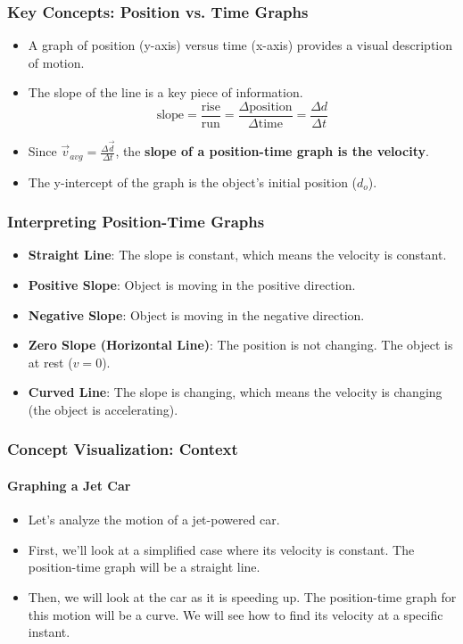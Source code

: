 \documentclass{beamer}
\begin{document}
\begin{frame}
\frametitle{Key Concepts: Position vs. Time Graphs}
\begin{itemize}
    \item A graph of position (y-axis) versus time (x-axis) provides a visual description of motion.
    \pause
    \item The \alert{slope} of the line is a key piece of information.
    \[ \text{slope} = \frac{\text{rise}}{\text{run}} = \frac{\Delta \text{position}}{\Delta \text{time}} = \frac{\Delta d}{\Delta t} \]
    \pause
    \item Since $\vec{v}_{avg} = \frac{\Delta \vec{d}}{\Delta t}$, the \textbf{slope of a position-time graph is the velocity}.
    \pause
    \item The \alert{y-intercept} of the graph is the object's initial position ($d_o$).
\end{itemize}
\end{frame}

\begin{frame}
\frametitle{Interpreting Position-Time Graphs}
\begin{itemize}
    \item \textbf{Straight Line}: The slope is constant, which means the \alert{velocity is constant}.
    \pause
    \item \textbf{Positive Slope}: Object is moving in the positive direction.
    \pause
    \item \textbf{Negative Slope}: Object is moving in the negative direction.
    \pause
    \item \textbf{Zero Slope (Horizontal Line)}: The position is not changing. The object is \alert{at rest} ($v=0$).
    \pause
    \item \textbf{Curved Line}: The slope is changing, which means the \alert{velocity is changing} (the object is accelerating).
\end{itemize}
\end{frame}

\begin{frame}
\frametitle{Concept Visualization: Context}
\framesubtitle{Graphing a Jet Car}
\begin{itemize}
    \item Let's analyze the motion of a jet-powered car.
    \pause
    \item First, we'll look at a simplified case where its velocity is constant. The position-time graph will be a straight line.
    \pause
    \item Then, we will look at the car as it is speeding up. The position-time graph for this motion will be a curve. We will see how to find its velocity at a specific instant.
\end{itemize}
\end{frame}
\end{document}
